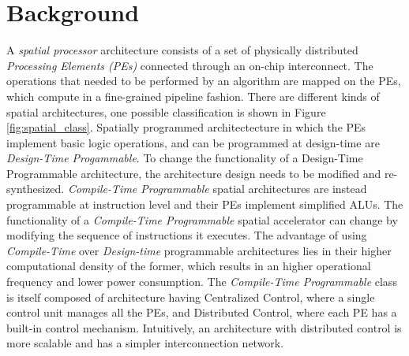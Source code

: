 \section{Background}
\label{sec:bg}
A \textit{spatial processor} architecture consists of a set of physically distributed \textit{Processing Elements (PEs)} connected through an on-chip interconnect. The operations that needed to be performed by an algorithm are mapped on the PEs, which compute in a fine-grained pipeline fashion. There are different kinds of spatial architectures\cite{parashar2014efficient}, one possible classification is shown in Figure \ref{fig:spatial_class}. Spatially programmed architectecture in which the PEs implement basic logic operations, and can be programmed at design-time are \textit{Design-Time Progammable}. To change the functionality of a Design-Time Programmable architecture, the architecture design needs to be modified and re-synthesized. \textit{Compile-Time Programmable} spatial architectures are instead programmable at instruction level and their PEs implement simplified ALUs. The functionality of a \textit{Compile-Time Programmable} spatial accelerator can change by modifying the sequence of instructions it executes.
The advantage of using \textit{Compile-Time} over \textit{Design-time} programmable architectures lies in their higher computational density of the former, which results in an higher operational frequency and lower power consumption.
The \textit{Compile-Time Programmable} class is itself composed of architecture having Centralized Control, where a single control unit manages all the PEs, and Distributed Control, where each PE has a built-in control mechanism. Intuitively, an architecture with distributed control is more scalable and has a simpler interconnection network.

